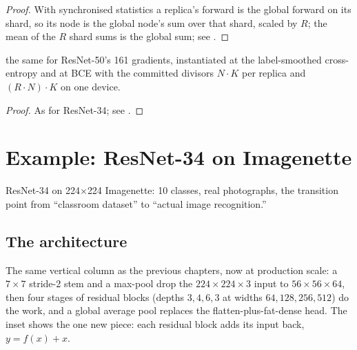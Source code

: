 \begin{proof}
\leanok
With synchronised statistics a replica's forward is the global forward on
its shard, so its node is the global node's sum over that shard, scaled by
\(R\); the mean of the \(R\) shard sums is the global sum; see
.
\end{proof}

\begin{theorem}
  \label{thm:resnet50_sync_tie}
  \leanok
  \Prove{} the same for ResNet-50's 161 gradients, instantiated at the
  label-smoothed cross-entropy and at BCE with the committed divisors
  \(N \cdot K\) per replica and \((R \cdot N) \cdot K\) on one device.
\end{theorem}

\begin{proof}
\leanok
As for ResNet-34; see .
\end{proof}

\section{Example: ResNet-34 on Imagenette}
\label{sec:residual_r34_example}

ResNet-34 on 224$\times$224 Imagenette: 10 classes, real photographs,
the transition point from ``classroom dataset'' to ``actual image
recognition.''

\subsection*{The architecture}

The same vertical column as the previous chapters, now at production
scale: a $7 \times 7$ stride-2 stem and a max-pool drop the
$224 \times 224 \times 3$ input to $56 \times 56 \times 64$, then four
stages of residual blocks (depths $3, 4, 6, 3$ at widths
$64, 128, 256, 512$) do the work, and a global average pool replaces
the flatten-plus-fat-dense head. The inset shows the one new piece:
each residual block adds its input back, $y = f(x) + x$.

